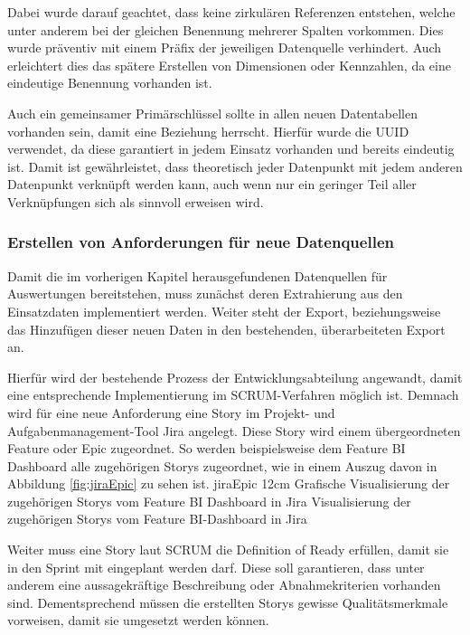 Dabei wurde darauf geachtet, dass keine zirkulären Referenzen entstehen, welche unter anderem bei der gleichen Benennung mehrerer Spalten vorkommen.
Dies wurde präventiv mit einem Präfix der jeweiligen Datenquelle verhindert.
Auch erleichtert dies das spätere Erstellen von Dimensionen oder Kennzahlen, da eine eindeutige Benennung vorhanden ist.

Auch ein gemeinsamer Primärschlüssel sollte in allen neuen Datentabellen vorhanden sein, damit eine Beziehung herrscht.
Hierfür wurde die \gls{UUID} verwendet, da diese garantiert in jedem Einsatz vorhanden und bereits eindeutig ist.
Damit ist gewährleistet, dass theoretisch jeder Datenpunkt mit jedem anderen Datenpunkt verknüpft werden kann, auch wenn nur ein geringer Teil aller Verknüpfungen sich als sinnvoll erweisen wird. 


\subsubsection{Erstellen von Anforderungen für neue Datenquellen} %
\label{subsub:stories}
Damit die im vorherigen Kapitel herausgefundenen Datenquellen für Auswertungen bereitstehen, muss zunächst deren Extrahierung aus den Einsatzdaten implementiert werden. 
Weiter steht der Export, beziehungsweise das Hinzufügen dieser neuen Daten in den bestehenden, überarbeiteten Export an.

Hierfür wird der bestehende Prozess der Entwicklungsabteilung angewandt, damit eine entsprechende Implementierung im SCRUM-Verfahren möglich ist.
Demnach wird für eine neue Anforderung eine \glqq Story\grqq{} im Projekt- und Aufgabenmanagement-Tool \glqq Jira\grqq{} angelegt.
Diese Story wird einem übergeordneten \gls{Feature} oder \glqq Epic\grqq{} zugeordnet.
So werden beispielsweise dem Feature \glqq \gls{BI} Dashboard\grqq{} alle zugehörigen Storys zugeordnet, wie in einem Auszug davon in Abbildung \ref{fig:jiraEpic} zu sehen ist.
\bild
{jiraEpic}
{12cm}
{Grafische Visualisierung der zugehörigen Storys vom Feature \glqq \gls{BI} Dashboard\grqq{} in Jira}
{Visualisierung der zugehörigen Storys vom Feature BI-Dashboard in Jira}

Weiter muss eine Story laut SCRUM die \glqq Definition of Ready\grqq{} erfüllen, damit sie in den Sprint mit eingeplant werden darf.
Diese soll garantieren, dass unter anderem eine aussagekräftige Beschreibung oder Abnahmekriterien vorhanden sind.
Dementsprechend müssen die erstellten Storys gewisse Qualitätsmerkmale vorweisen, damit sie umgesetzt werden können.

